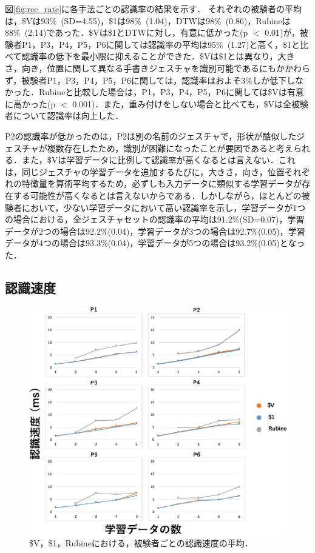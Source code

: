 図\ref{fig:rec_rate}に各手法ごとの認識率の結果を示す．
それぞれの被験者の平均は，\$Vは93\%~(SD=4.55)，\$1は98\%~(1.04)，DTWは98\%~(0.86)，Rubineは88\%~(2.14)であった．\$Vは\$1とDTWに対し，有意に低かった(p $<$ 0.01)が，被験者P1，P3，P4，P5，P6に関しては認識率の平均は95\%~(1.27)と高く，\$1と比べて認識率の低下を最小限に抑えることができた．\$Vは\$1とは異なり，大きさ，向き，位置に関して異なる手書きジェスチャを識別可能であるにもかかわらず，被験者P1，P3，P4，P5，P6に関しては，認識率はおよそ3\%しか低下しなかった．Rubineと比較した場合は，P1，P3，P4，P5，P6に関しては\$Vは有意に高かった(p $<$ 0.001)．また，重み付けをしない場合と比べても，\$Vは全被験者について認識率は向上した．

P2の認識率が低かったのは，P2は別の名前のジェスチャで，形状が酷似したジェスチャが複数存在したため，識別が困難になったことが要因であると考えられる．また，\$Vは学習データに比例して認識率が高くなるとは言えない．これは，同じジェスチャの学習データを追加するたびに，大きさ，向き，位置それぞれの特徴量を算術平均するため，必ずしも入力データに類似する学習データが存在する可能性が高くなるとは言えないからである．しかしながら，ほとんどの被験者において，少ない学習データにおいて高い認識率を示し，学習データが1つの場合における，全ジェスチャセットの認識率の平均は91.2\%(SD=0.07)，学習データが2つの場合は92.2\%(0.04)，学習データが3つの場合は92.7\%(0.05)，学習データが4つの場合は93.3\%(0.04)，学習データが5つの場合は93.2\%(0.05)となった．

\newpage
\subsection{認識速度}
\begin{figure}[!h]
\centering
\includegraphics[width=1.0\columnwidth]{img/rec_speed.eps}
\caption{\$V，\$1，Rubineにおける，被験者ごとの認識速度の平均．}
\label{fig:rec_speed}
\end{figure}

